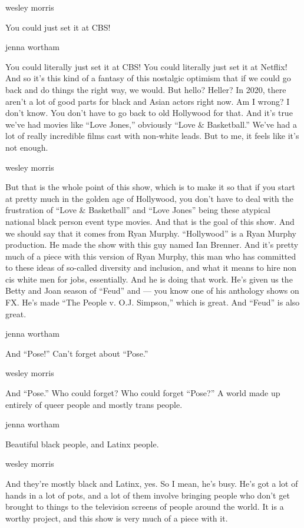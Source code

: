 wesley morris

You could just set it at CBS!

jenna wortham

You could literally just set it at CBS! You could literally just set it
at Netflix! And so it's this kind of a fantasy of this nostalgic
optimism that if we could go back and do things the right way, we would.
But hello? Heller? In 2020, there aren't a lot of good parts for black
and Asian actors right now. Am I wrong? I don't know. You don't have to
go back to old Hollywood for that. And it's true we've had movies like
``Love Jones,'' obviously ``Love \& Basketball.'' We've had a lot of
really incredible films cast with non-white leads. But to me, it feels
like it's not enough.

wesley morris

But that is the whole point of this show, which is to make it so that if
you start at pretty much in the golden age of Hollywood, you don't have
to deal with the frustration of ``Love \& Basketball'' and ``Love
Jones'' being these atypical national black person event type movies.
And that is the goal of this show. And we should say that it comes from
Ryan Murphy. ``Hollywood'' is a Ryan Murphy production. He made the show
with this guy named Ian Brenner. And it's pretty much of a piece with
this version of Ryan Murphy, this man who has committed to these ideas
of so-called diversity and inclusion, and what it means to hire non cis
white men for jobs, essentially. And he is doing that work. He's given
us the Betty and Joan season of ``Feud'' and --- you know one of his
anthology shows on FX. He's made ``The People v. O.J. Simpson,'' which
is great. And ``Feud'' is also great.

jenna wortham

And ``Pose!'' Can't forget about ``Pose.''

wesley morris

And ``Pose.'' Who could forget? Who could forget ``Pose?'' A world made
up entirely of queer people and mostly trans people.

jenna wortham

Beautiful black people, and Latinx people.

wesley morris

And they're mostly black and Latinx, yes. So I mean, he's busy. He's got
a lot of hands in a lot of pots, and a lot of them involve bringing
people who don't get brought to things to the television screens of
people around the world. It is a worthy project, and this show is very
much of a piece with it.

